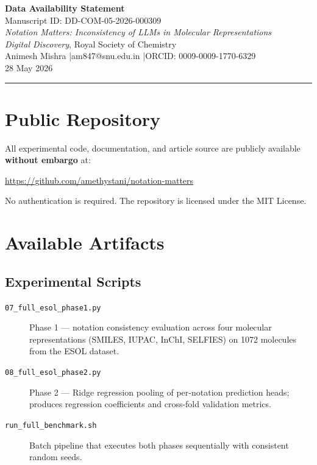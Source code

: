 \documentclass[12pt,a4paper]{article}
\begin{document}
\begin{center}
  {\LARGE\bfseries Data Availability Statement}\\[0.8em]
  {\large Manuscript ID: DD-COM-05-2026-000309}\\[0.4em]
  {\large \textit{Notation Matters: Inconsistency of LLMs in Molecular Representations}}\\[0.4em]
  {\normalsize \textit{Digital Discovery}, Royal Society of Chemistry}\\[1.2em]
  {\normalsize Animesh Mishra \quad|\quad am847@snu.edu.in \quad|\quad ORCID: 0009-0009-1770-6329}\\[0.3em]
  {\normalsize 28 May 2026}
\end{center}

\hrule
\vspace{1.5em}

\section*{Public Repository}

All experimental code, documentation, and article source are publicly available \textbf{without embargo} at:

\begin{center}
  \url{https://github.com/amethystani/notation-matters}
\end{center}

No authentication is required. The repository is licensed under the MIT License.

\section*{Available Artifacts}

\subsection*{Experimental Scripts}

\begin{description}
  \item[\texttt{07\_full\_esol\_phase1.py}] Phase 1 --- notation consistency evaluation across four molecular representations (SMILES, IUPAC, InChI, SELFIES) on 1072 molecules from the ESOL dataset.

  \item[\texttt{08\_full\_esol\_phase2.py}] Phase 2 --- Ridge regression pooling of per-notation prediction heads; produces regression coefficients and cross-fold validation metrics.

  \item[\texttt{run\_full\_benchmark.sh}] Batch pipeline that executes both phases sequentially with consistent random seeds.
\end{description}
\end{document}
